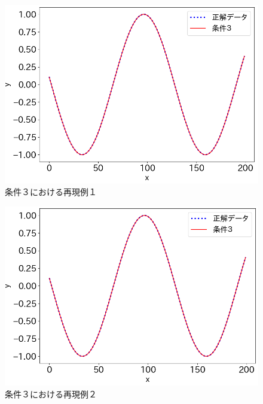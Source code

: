 \begin{figure}[hp]
  \begin{center}
    \includegraphics[width=12cm]{./fig/append5}
    \caption{条件３における再現例１}
    \label{fig:append5}
  \end{center}
\end{figure}

\begin{figure}[htp]
  \begin{center}
    \includegraphics[width=12cm]{./fig/append6}
    \caption{条件３における再現例２}
    \label{fig:append6}
  \end{center}
\end{figure}


